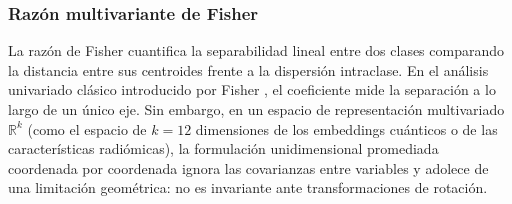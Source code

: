 
\subsubsection{Razón multivariante de Fisher}

La razón de Fisher cuantifica la separabilidad lineal entre dos clases comparando la
distancia entre sus centroides frente a la dispersión intraclase. En el análisis univariado
clásico introducido por Fisher \cite{fisher1936use}, el coeficiente mide la separación a lo
largo de un único eje. Sin embargo, en un espacio de representación multivariado $\mathbb{R}^k$
(como el espacio de $k = 12$ dimensiones de los embeddings cuánticos o de las características
radiómicas), la formulación unidimensional promediada coordenada por coordenada ignora las
covarianzas entre variables y adolece de una limitación geométrica: no es invariante
ante transformaciones de rotación.

